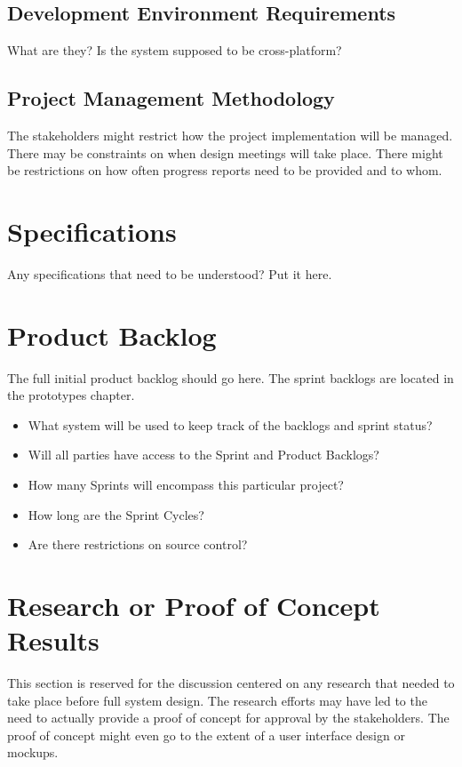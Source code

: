 \subsection{Development Environment Requirements}
What are they?  Is the system supposed to be cross-platform? 

\subsection{Project  Management Methodology}
The stakeholders might restrict how the project implementation will be managed. 
 There may be constraints on when design meetings will take place.  There might 
be restrictions on how often progress reports need to be provided and to whom. 


\section{Specifications}
Any specifications that need to be understood?  Put it here.  

\section{Product Backlog}
The full initial product backlog should go here.  The sprint backlogs are located in the prototypes chapter.

\begin{itemize}
\item What system will be used to keep track of the backlogs and sprint status?
\item Will all parties have access to the Sprint and Product Backlogs?
\item How many Sprints will encompass this particular project?
\item How long are the Sprint Cycles?
\item Are there restrictions on source control? 
\end{itemize}





\section{Research or Proof of Concept Results}
This section is reserved for the discussion centered on any research that needed 
to take place before full system design.  The research efforts may have led to 
the need to actually provide a proof of concept for approval by the stakeholders. 
 The proof of concept might even go to the extent of a user interface design or 
mockups. 


